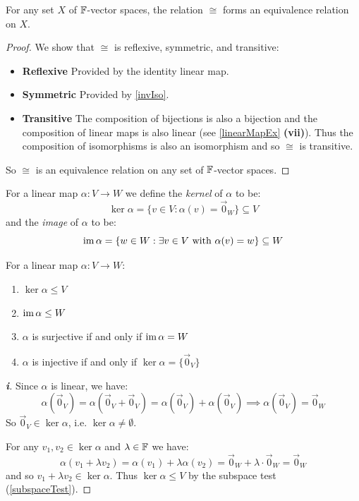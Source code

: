 \documentclass[../main.tex]{subfiles}
\begin{document}
\begin{corollary}
  For any set $X$ of $\mathbb{F}$-vector spaces, the relation $\cong$ forms an equivalence relation on $X$. \label{equivIso}
\end{corollary}
\begin{proof}
  We show that $\cong$ is reflexive, symmetric, and transitive:
  \begin{itemize}
    \item \textbf{Reflexive} Provided by the identity linear map.
    \item \textbf{Symmetric} Provided by \cref{invIso}.\par
    \item \textbf{Transitive} The composition of bijections is also a bijection and the composition of linear maps is also linear (see \cref{linearMapEx} \textbf{(vii)}).
      Thus the composition of isomorphisms is also an isomorphism and so $\cong$ is transitive.
  \end{itemize}
  So $\cong$ is an equivalence relation on any set of $\mathbb{F}$-vector spaces.
\end{proof}
\begin{definition}
  For a linear map $\alpha: V \to W$ we define the \textit{kernel} of $\alpha$ to be:
  \[
    \ker \alpha = \{v \in V: \alpha(v) = \vec{0}_{W}\} \subseteq V
  \]
  and the \textit{image} of $\alpha$ to be:
  \[
    \operatorname{im} \alpha = \{w \in W: \exists v \in V \text{ with } \alpha(v) = w\} \subseteq W
  \]
\end{definition}
\begin{lemma}
  For a linear map $\alpha: V \to W$: \label{imKerProp}
  \begin{enumerate}
    \item $\ker \alpha \leq V$
    \item $\operatorname{im} \alpha \leq W$
    \item $\alpha$ is surjective if and only if $\operatorname{im} \alpha = W$
    \item $\alpha$ is injective if and only if $\ker \alpha = \{\vec{0}_V\}$
  \end{enumerate}
\end{lemma}
\begin{proof}[\textbf{i}]
  Since $\alpha$ is linear, we have:
  \[
    \alpha(\vec{0}_{V}) = \alpha(\vec{0}_{V} + \vec{0}_{V}) = \alpha(\vec{0}_{V}) + \alpha(\vec{0}_{V}) \implies \alpha(\vec{0}_{V}) = \vec{0}_{W}
  \]
  So $\vec{0}_{V} \in \ker \alpha$, i.e. $\ker \alpha \neq \emptyset$.

  For any $v_1, v_2 \in \ker \alpha$ and $\lambda \in \mathbb{F}$ we have:
  \[
    \alpha(v_1 + \lambda v_2) = \alpha(v_1) + \lambda \alpha(v_2) = \vec{0}_W + \lambda \cdot \vec{0}_{W} = \vec{0}_{W}
  \]
  and so $v_1 + \lambda v_2 \in \ker \alpha$.
  Thus $\ker \alpha \leq V$ by the subspace test (\cref{subspaceTest}).
\end{proof}
\end{document}
